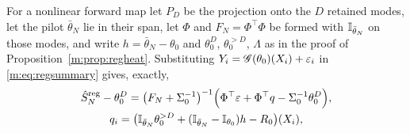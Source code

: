\begin{remark}\label{m:rem:regnonlin}
For a nonlinear forward map let $P_D$ be the projection onto the $D$ retained modes, let the pilot $\bar\theta_N$ lie in their span, let $\Phi$ and $F_N=\Phi^\top\Phi$ be formed with $\mathbb{I}_{\bar\theta_N}$ on those modes, and write $h=\bar\theta_N-\theta_0$ and $\theta_0^D$, $\theta_0^{>D}$, $\Lambda$ as in the proof of Proposition~\ref{m:prop:regheat}. Substituting $Y_i=\mathscr{G}(\theta_0)(X_i)+\varepsilon_i$ in \eqref{m:eq:regsummary} gives, exactly,
\[
\begin{gathered}
\hat S^{\rm reg}_N-\theta_0^D=\big(F_N+\Sigma_0^{-1}\big)^{-1}\Big(\Phi^\top\varepsilon+\Phi^\top q-\Sigma_0^{-1}\theta_0^D\Big),\\
q_i=\big(\mathbb{I}_{\bar\theta_N}\theta_0^{>D}+(\mathbb{I}_{\bar\theta_N}-\mathbb{I}_{\theta_0})h-R_0\big)(X_i),
\end{gathered}
\]

\end{remark}
